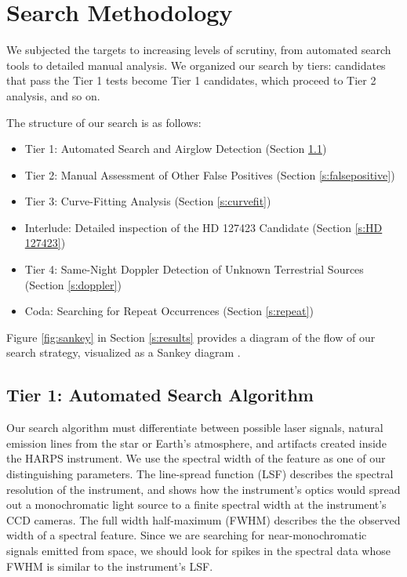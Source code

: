 \documentclass[twocolumn]{aastex701}
\begin{document}
\section{Search Methodology}
We subjected the targets to increasing levels of scrutiny, from automated search tools to detailed manual analysis.  We organized our search by tiers: candidates that pass the Tier 1 tests become Tier 1 candidates, which proceed to Tier 2 analysis, and so on.

The structure of our search is as follows:
\begin{itemize}
    \item Tier 1: Automated Search and Airglow Detection (Section \ref{s:automated})
    \item Tier 2: Manual Assessment of Other False Positives (Section \ref{s:falsepositive})
    \item Tier 3: Curve-Fitting Analysis (Section \ref{s:curvefit})
    \item Interlude: Detailed inspection of the HD 127423 Candidate (Section \ref{s:HD 127423})
    \item Tier 4: Same-Night Doppler Detection of Unknown Terrestrial Sources (Section \ref{s:doppler})
    \item Coda: Searching for Repeat Occurrences (Section \ref{s:repeat})
\end{itemize}

Figure \ref{fig:sankey} in Section \ref{s:results} provides a diagram of the flow of our search strategy, visualized as a Sankey diagram \citep{sankey1898}.

\subsection{Tier  1: Automated Search Algorithm}
\label{s:automated}
Our search algorithm must differentiate between possible laser signals, natural emission lines from the star or Earth's atmosphere, and artifacts created inside the HARPS instrument. We use the spectral width of the feature as one of our distinguishing parameters. The line-spread function (LSF) describes the spectral resolution of the instrument, and shows how the instrument's optics would spread out a monochromatic light source to a finite spectral width at the instrument's CCD cameras. The full width half-maximum (FWHM) describes the the observed width of a spectral feature. Since we are searching for near-monochromatic signals emitted from space, we should look for spikes in the spectral data whose FWHM is similar to the instrument's LSF.
\end{document}
